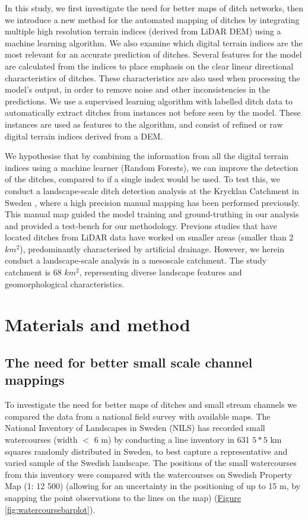 \documentclass[11pt, review]{elsarticle} %
\begin{document}
In this study, we first investigate the need for better maps of ditch networks, then we introduce a new method for the automated mapping of ditches by integrating multiple high resolution terrain indices (derived from LiDAR DEM) using a machine learning algorithm. We also examine which digital terrain indices are the most relevant for an accurate prediction of ditches. Several features for the model are calculated from the indices to place emphasis on the clear linear directional characteristics of ditches. These characteristics are also used when processing the model's output, in order to remove noise and other inconsistencies in the predictions. We use a supervised learning algorithm with labelled ditch data to automatically extract ditches from instances not before seen by the model. These instances are used as features to the algorithm, and consist of refined or raw digital terrain indices derived from a DEM.

We hypothesise that by combining the information from all the digital terrain indices using a machine learner (Random Forests), we can improve the detection of the ditches, compared to if a single index would be used. To test this, we conduct a landscape-scale ditch detection analysis at the Krycklan Catchment in Sweden \citep{krycklancatchment}, where a high precision manual mapping has been performed previously. This manual map guided the model training and ground-truthing in our analysis and provided a test-bench for our methodology. Previous studies \citep{roelens, bailly, rapinel, kiss} that have located ditches from LiDAR data have worked on smaller areas (smaller than 2 $km^2$), predominantly characterised by artificial drainage. However, we herein conduct a landscape-scale analysis in a mesoscale catchment. The study  catchment  is 68 $km^2$, representing diverse landscape features and geomorphological characteristics.


\section{Materials and method}
\label{method}

\subsection{The need for better small scale channel mappings}
To investigate the need for better maps of ditches and small stream channels we compared the data from a national field survey with available maps. The National Inventory of Landscapes in Sweden (NILS) has recorded small watercourses (width $<$ 6 m) by conducting a line inventory in 631 $5*5$ km squares randomly distributed in Sweden, to best capture a representative and varied sample of the Swedish landscape. The positions of the small watercourses from this inventory were compared with the watercourses on Swedish Property Map (1: 12 500) (allowing for an uncertainty in the positioning of up to 15 m, by snapping the point observations to the lines on the map) (\hyperref[fig:watercoursebarplot]{Figure} \ref{fig:watercoursebarplot}).
\end{document}
